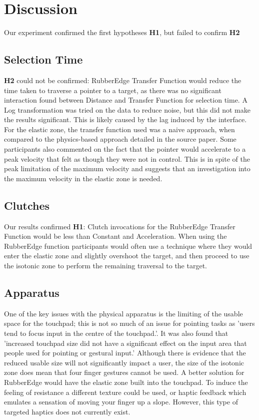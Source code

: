 \section{Discussion}
Our experiment confirmed the first hypotheses \textbf{H1}, but failed to confirm \textbf{H2}

\subsection{Selection Time}
\textbf{H2} could not be confirmed: RubberEdge Transfer Function would reduce the time taken to traverse a pointer to a target, as there was no significant interaction found between Distance and Transfer Function for selection time. A Log transformation was tried on the data to reduce noise, but this did not make the results significant. This is likely caused by the lag induced by the interface. For the elastic zone, the transfer function used was a naive approach, when compared to the physics-based approach detailed in the source paper\cite{Casiez2007RubberEdge}. Some participants also commented on the fact that the pointer would accelerate to a peak velocity that felt as though they were not in control. This is in spite of the peak limitation of the maximum velocity and suggests that an investigation into the maximum velocity in the elastic zone is needed.

\subsection{Clutches}
Our results confirmed \textbf{H1}: Clutch invocations for the RubberEdge Transfer Function would be less than Constant and Acceleration. When using the RubberEdge function participants would often use a technique where they would enter the elastic zone and slightly overshoot the target, and then proceed to use the isotonic zone to perform the remaining traversal to the target.

\subsection{Apparatus}
One of the key issues with the physical apparatus is the limiting of the usable space for the touchpad; this is not so much of an issue for pointing tasks as 'users tend to focus input in the centre of the touchpad.'\cite{Avera2016EffectsPerformance}. It was also found that 'increased touchpad size did not have a significant effect on the input area that people used for pointing or gestural input.' Although there is evidence that the reduced usable size will not significantly impact a user, the size of the isotonic zone does mean that four finger gestures cannot be used. A better solution for RubberEdge would have the elastic zone built into the touchpad. To induce the feeling of resistance a different texture\cite{SureshBabu2011EffectsAssessments.} could be used, or haptic feedback which emulates a sensation of moving your finger up a slope. However, this type of targeted haptics does not currently exist.